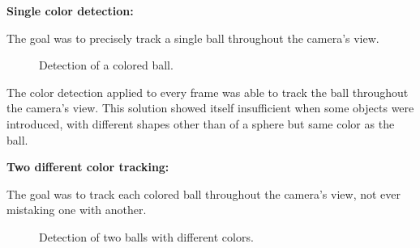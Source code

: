 \documentclass[10pt,twocolumn,letterpaper]{article}
\begin{document}
\bigbreak{}
\textbf{Single color detection:}
\bigbreak{}

The goal was to precisely track a single ball throughout the camera's view.

\begin{figure}[!h]
\centering
\setlength{\fboxsep}{1pt}
\setlength{\fboxrule}{1pt}
\caption{Detection of a colored ball.}\label{fig:single_color}
\end{figure}

The color detection applied to every frame was able to track the ball
throughout the camera's view. This solution showed itself insufficient when
some objects were introduced, with different shapes other than of a sphere but
same color as the ball.

\bigbreak{}
\textbf{Two different color tracking:}
\bigbreak{}

The goal was to track each colored ball throughout the camera's view, not ever
mistaking one with another.

\begin{figure}[!h]
\centering
\setlength{\fboxsep}{1pt}
\setlength{\fboxrule}{1pt}
\caption{Detection of two balls with different colors.}\label{fig:diff_color}
\end{figure}
\end{document}
